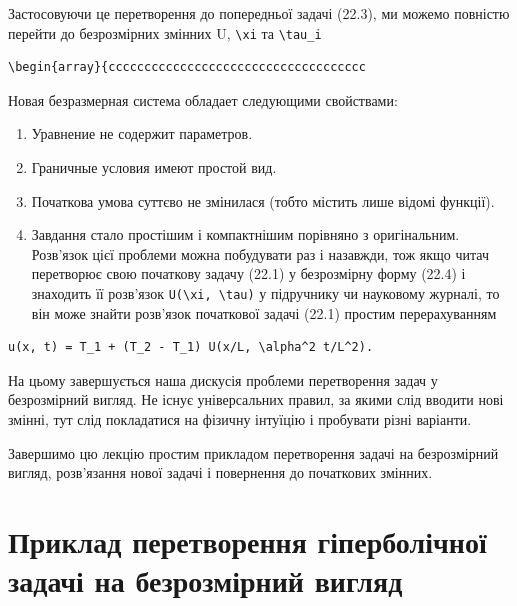 \documentclass[
  ukrainian,
]{article}
\begin{document}
Застосовуючи це перетворення до попередньої задачі (22.3), ми можемо
повністю перейти до безрозмірних змінних U, \texttt{\textbackslash{}xi}
та \texttt{\textbackslash{}tau\_i}

\begin{verbatim}
\begin{array}{cccccccccccccccccccccccccccccccccccc
\end{verbatim}

Новая безразмерная система обладает следующими свойствами:

\begin{enumerate}
\def\labelenumi{\arabic{enumi}.}
\item
  Уравнение не содержит параметров.
\item
  Граничные условия имеют простой вид.
\item
  Початкова умова суттєво не змінилася (тобто містить лише відомі
  функції).
\item
  Завдання стало простішим і компактнішим порівняно з оригінальним.
  Розв'язок цієї проблеми можна побудувати раз і назавжди, тож якщо
  читач перетворює свою початкову задачу (22.1) у безрозмірну форму
  (22.4) і знаходить її розв'язок
  \texttt{U(\textbackslash{}xi,\ \textbackslash{}tau)} у підручнику чи
  науковому журналі, то він може знайти розв'язок початкової задачі
  (22.1) простим перерахуванням
\end{enumerate}

\begin{verbatim}
u(x, t) = T_1 + (T_2 - T_1) U(x/L, \alpha^2 t/L^2).
\end{verbatim}

На цьому завершується наша дискусія проблеми перетворення задач у
безрозмірний вигляд. Не існує універсальних правил, за якими слід
вводити нові змінні, тут слід покладатися на фізичну інтуїцію і
пробувати різні варіанти.

Завершимо цю лекцію простим прикладом перетворення задачі на
безрозмірний вигляд, розв'язання нової задачі і повернення до початкових
змінних.

\section{Приклад перетворення гіперболічної задачі на безрозмірний
вигляд}\label{ux43fux440ux438ux43aux43bux430ux434-ux43fux435ux440ux435ux442ux432ux43eux440ux435ux43dux43dux44f-ux433ux456ux43fux435ux440ux431ux43eux43bux456ux447ux43dux43eux457-ux437ux430ux434ux430ux447ux456-ux43dux430-ux431ux435ux437ux440ux43eux437ux43cux456ux440ux43dux438ux439-ux432ux438ux433ux43bux44fux434}
\end{document}
